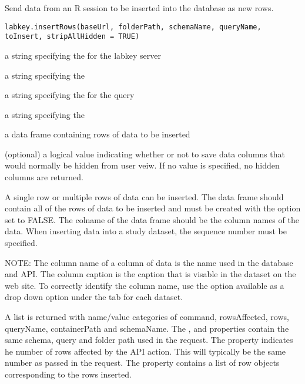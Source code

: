 \documentclass{article}
\begin{document}
\begin{Description}\relax
Send data from an R session to be inserted into the database as new rows.
\end{Description}
\begin{Usage}
\begin{verbatim}
labkey.insertRows(baseUrl, folderPath, schemaName, queryName, toInsert, stripAllHidden = TRUE)
\end{verbatim}
\end{Usage}
\begin{Arguments}
\begin{ldescription}
\item[\code{baseUrl}] a string specifying the for the labkey server
\item[\code{folderPath}] a string specifying the  
\item[\code{schemaName}] a string specifying the   for the query
\item[\code{queryName}] a string specifying the   
\item[\code{toInsert}] a data frame containing rows of data to be inserted
\item[\code{stripAllHidden}] (optional) a logical value indicating whether or not to save data columns that would 
normally be hidden from user veiw. If no value is specified, no hidden columns are returned.
\end{ldescription}
\end{Arguments}
\begin{Details}\relax
A single row or multiple rows of data can be inserted.  The  data frame should contain
all of the rows of data to be inserted and must be created with the  option
set to FALSE.  The colname of the data frame should be the column names of the data.
When inserting data into a study dataset, the sequence number must be specified.

NOTE: The column name of a column of data is the name used in the database and API. The column caption is the
caption that is visable in the dataset on the web site. To correctly identify the column name, use the
 option available as a drop down option under the  tab for each dataset.
\end{Details}
\begin{Value}
A list is returned with name/value categories of command, rowsAffected, rows, queryName, containerPath and schemaName.
The ,  and  properties contain the same schema, query 
and folder path used in the request.  The
 property indicates he number of rows affected by the API action. This will typically be the same
number as passed in the request. The  property contains a list of row objects corresponding to the rows 
inserted.
\end{Value}
\end{document}
